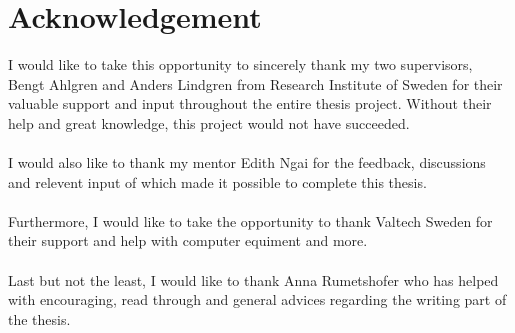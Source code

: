 \section*{Acknowledgement}

I would like to take this opportunity to sincerely thank my two supervisors, Bengt Ahlgren and Anders Lindgren from Research Institute of Sweden for their valuable support and input throughout the entire thesis project. Without their help and great knowledge, this project would not have succeeded.\\\\
I would also like to thank my mentor Edith Ngai for the feedback, discussions and relevent input of which made it possible to complete this thesis.\\\\
Furthermore, I would like to take the opportunity to thank Valtech Sweden for their support and help with computer equiment and more.\\\\
Last but not the least, I would like to thank Anna Rumetshofer who has helped with encouraging, read through and general advices regarding the writing part of the thesis.\\\\








